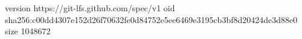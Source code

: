 version https://git-lfs.github.com/spec/v1
oid sha256:c00dd4307e152d26f70632fe0d84752e5ee6469e3195cb3bf8d20424de3d88e0
size 1048672
